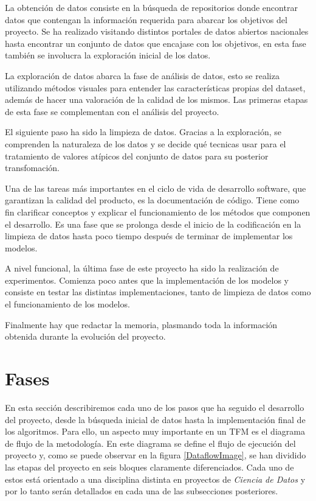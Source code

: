 La obtención de datos consiste en la búsqueda de repositorios donde encontrar datos que contengan la información requerida para abarcar los objetivos del proyecto. Se ha realizado visitando distintos portales de datos abiertos nacionales hasta encontrar un conjunto de datos que encajase con los objetivos, en esta fase también se involucra la exploración inicial de los datos.

La exploración de datos abarca la fase de análisis de datos, esto se realiza utilizando métodos visuales para entender las características propias del dataset, además de hacer una valoración de la calidad de los mismos. Las primeras etapas de esta fase se complementan con el análisis del proyecto.

El siguiente paso ha sido la limpieza de datos. Gracias a la exploración, se comprenden la naturaleza de los datos y se decide qué tecnicas usar para el tratamiento de valores atípicos del conjunto de datos para su posterior transfomación.

Una de las tareas más importantes en el ciclo de vida de desarrollo software, que garantizan la calidad del producto, es la documentación de código. Tiene como fin
clarificar conceptos y explicar el funcionamiento de los métodos que componen el desarrollo. Es una fase que se prolonga desde el inicio de la codificación en la limpieza de datos hasta poco tiempo después de terminar de implementar los modelos.

A nivel funcional, la última fase de este proyecto ha sido la realización de experimentos. Comienza poco antes que la implementación de los modelos y consiste en testar las distintas implementaciones, tanto de limpieza de datos como el funcionamiento de los modelos.

Finalmente hay que redactar la memoria, plasmando toda la información obtenida durante la evolución del proyecto.


\clearpage

\section{Fases}

    En esta sección describiremos cada uno de los pasos que ha seguido el desarrollo del proyecto, desde la búsqueda inicial de datos hasta la implementación final de los algoritmos. Para ello, un aspecto muy importante en un TFM es el diagrama de flujo de la metodología. En este diagrama se define el flujo de ejecución del proyecto y, como se puede observar en la figura \eqref{DataflowImage}, se han dividido las etapas del proyecto en seis bloques claramente diferenciados. Cada uno de estos está orientado a una disciplina distinta en proyectos de \textit{Ciencia de Datos} y por lo tanto serán detallados en cada una de las subsecciones posteriores.\\


